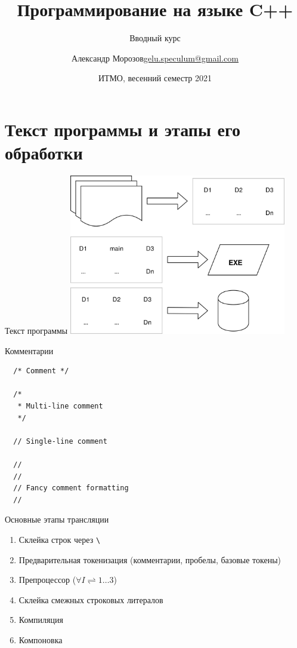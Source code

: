 \documentclass[unknownkeysallowed,xcolor=table]{beamer}
\title[C++]
{Программирование на языке C++}
\subtitle{Вводный курс}
\author[А.~Б.~Морозов]
{
  \texorpdfstring{Александр Морозов\newline\href{mailto:gelu.speculum@gmail.com}{gelu.speculum@gmail.com}}
  {Александр Морозов}
}
\date[ITMO 2021]
{ИТМО, весенний семестр 2021}
\begin{document}
 
\frame{\titlepage}

\section{Текст программы и этапы его обработки}

\begin{frame}{Текст программы}
  \includegraphics[align=c,width=9.5cm,keepaspectratio]{images/text_decl_bin.png}
\end{frame}

\begin{frame}[fragile]{Комментарии}
  \begin{lstlisting}
  /* Comment */

  /*
   * Multi-line comment
   */

  // Single-line comment

  //
  //
  // Fancy comment formatting
  //
  \end{lstlisting}
\end{frame}

\begin{frame}[fragile]{Основные этапы трансляции}
  \begin{enumerate}
    \item Склейка строк через \lstinline{\} \vspace{1em}
    \item Предварительная токенизация (комментарии, пробелы, базовые токены) \vspace{1em}
    \item Препроцессор ($\forall I \rightleftharpoons 1\dotso3$) \vspace{1em}
    \item Склейка смежных строковых литералов \vspace{1em}
    \item Компиляция \vspace{1em}
    \item Компоновка
  \end{enumerate}
\end{frame}
\end{document}
